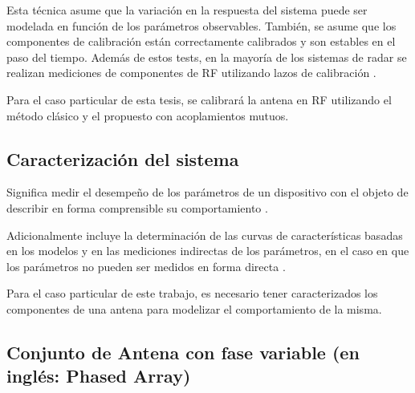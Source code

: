 Esta técnica asume que la variación en la respuesta del sistema puede ser modelada en función de los parámetros observables.
También, se asume que los componentes de calibración están correctamente calibrados y son estables en el paso del tiempo.
Además de estos tests, en la mayoría de los sistemas de radar se realizan mediciones de componentes de RF utilizando lazos de
calibración \cite{Curlander1991}.

Para el caso particular de esta tesis, se calibrará la antena en RF utilizando el método clásico y el propuesto con 
acoplamientos mutuos.


\subsection{Caracterización del sistema}

Significa medir el desempeño de los parámetros de un dispositivo con el objeto de describir en
forma comprensible su comportamiento \cite{Mittermayer2007}.

Adicionalmente incluye la determinación de las curvas de características basadas
en los modelos y en las mediciones indirectas de los parámetros, en el caso en que los parámetros no pueden ser medidos
en forma directa \cite{Mittermayer2007}.

Para el caso particular de este trabajo, es necesario tener caracterizados los componentes de una antena para modelizar el 
comportamiento de la misma.


\subsection{Conjunto de Antena con fase variable (en inglés: Phased Array)}

